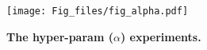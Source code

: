 \begin{figure}[h]
 \centering
  \texttt{[image: Fig\_files/fig\_alpha.pdf]}
  \caption{\textbf{The hyper-param ($\alpha$) experiments.}}
  \label{hyper_alpha}
\end{figure}

